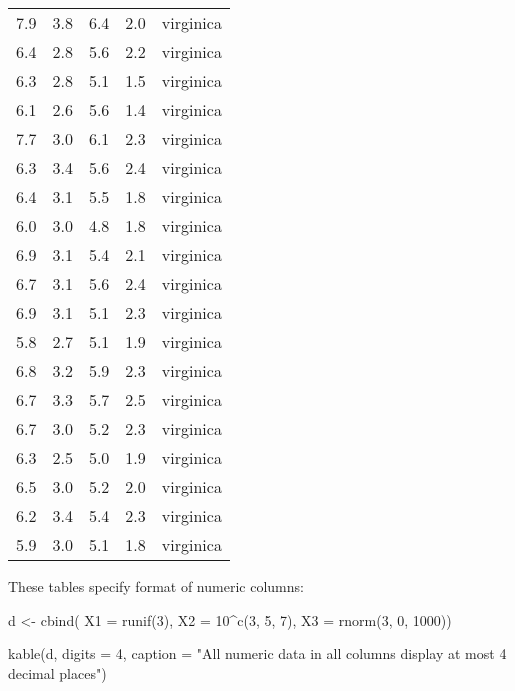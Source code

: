 \documentclass[
  letterpaper,
  DIV=11,
  numbers=noendperiod]{scrartcl}
\newenvironment{Shaded}{\begin{snugshade}}{\end{snugshade}}
\newcommand{\AttributeTok}[1]{\textcolor[rgb]{0.40,0.45,0.13}{#1}}
\newcommand{\DecValTok}[1]{\textcolor[rgb]{0.68,0.00,0.00}{#1}}
\newcommand{\FunctionTok}[1]{\textcolor[rgb]{0.28,0.35,0.67}{#1}}
\newcommand{\NormalTok}[1]{\textcolor[rgb]{0.00,0.23,0.31}{#1}}
\newcommand{\OtherTok}[1]{\textcolor[rgb]{0.00,0.23,0.31}{#1}}
\newcommand{\SpecialCharTok}[1]{\textcolor[rgb]{0.37,0.37,0.37}{#1}}
\newcommand{\StringTok}[1]{\textcolor[rgb]{0.13,0.47,0.30}{#1}}
\begin{document}
\begin{longtable}[]{@{}lrlrc@{}}
7.9 & 3.8 & 6.4 & 2.0 & virginica \\
6.4 & 2.8 & 5.6 & 2.2 & virginica \\
6.3 & 2.8 & 5.1 & 1.5 & virginica \\
6.1 & 2.6 & 5.6 & 1.4 & virginica \\
7.7 & 3.0 & 6.1 & 2.3 & virginica \\
6.3 & 3.4 & 5.6 & 2.4 & virginica \\
6.4 & 3.1 & 5.5 & 1.8 & virginica \\
6.0 & 3.0 & 4.8 & 1.8 & virginica \\
6.9 & 3.1 & 5.4 & 2.1 & virginica \\
6.7 & 3.1 & 5.6 & 2.4 & virginica \\
6.9 & 3.1 & 5.1 & 2.3 & virginica \\
5.8 & 2.7 & 5.1 & 1.9 & virginica \\
6.8 & 3.2 & 5.9 & 2.3 & virginica \\
6.7 & 3.3 & 5.7 & 2.5 & virginica \\
6.7 & 3.0 & 5.2 & 2.3 & virginica \\
6.3 & 2.5 & 5.0 & 1.9 & virginica \\
6.5 & 3.0 & 5.2 & 2.0 & virginica \\
6.2 & 3.4 & 5.4 & 2.3 & virginica \\
5.9 & 3.0 & 5.1 & 1.8 & virginica \\

\end{longtable}

These tables specify format of numeric columns:

\begin{Shaded}
\begin{Highlighting}[]
\NormalTok{d }\OtherTok{\textless{}{-}} \FunctionTok{cbind}\NormalTok{(}
  \AttributeTok{X1 =} \FunctionTok{runif}\NormalTok{(}\DecValTok{3}\NormalTok{), }
  \AttributeTok{X2 =} \DecValTok{10}\SpecialCharTok{\^{}}\FunctionTok{c}\NormalTok{(}\DecValTok{3}\NormalTok{, }\DecValTok{5}\NormalTok{, }\DecValTok{7}\NormalTok{), }
  \AttributeTok{X3 =} \FunctionTok{rnorm}\NormalTok{(}\DecValTok{3}\NormalTok{, }\DecValTok{0}\NormalTok{, }\DecValTok{1000}\NormalTok{))}

\FunctionTok{kable}\NormalTok{(d, }\AttributeTok{digits =} \DecValTok{4}\NormalTok{,}
      \AttributeTok{caption =} \StringTok{"All numeric data in all columns display at most 4 decimal places"}\NormalTok{)}
\end{Highlighting}
\end{Shaded}
\end{document}
